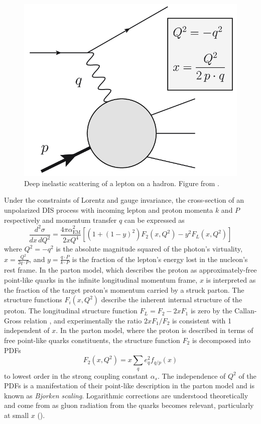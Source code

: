 \begin{figure}[t]
  \includegraphics{dis_electron_proton.png}
  \caption{Deep inelastic scattering of a lepton on a hadron. Figure from .
}
  \label{fig:dis}
\end{figure}

Under the constraints of Lorentz and gauge invariance, the cross-section of an unpolarized \ac{DIS} process with incoming lepton and proton momenta $k$ and $P$ respectively and momentum transfer $q$ can be expressed as \cite{Tanabashi:2018oca}
\begin{equation}
  \frac{d^2 \sigma}{dx \, dQ^2} = \frac{4\pi\alpha^2_\textrm{EM}}{2xQ^4}\left[ \left(1+(1-y)^2\right) F_2\left(x, Q^2\right) - y^2 F_L \left(x, Q^2\right) \right]
  \label{eq:dis}
\end{equation}
where $Q^2 = -q^2$ is the absolute magnitude squared of the photon's virtuality, $x = \frac{Q^2}{2q \cdot P}$, and $y = \frac{q \cdot P}{k \cdot P}$ is the fraction of the lepton's energy lost in the nucleon's rest frame.
In the parton model, which describes the proton as approximately-free point-like quarks in the infinite longitudinal momentum frame, $x$ is interpreted as the fraction of the target proton's momentum carried by a struck parton.
The structure functions $F_i(x, Q^2)$ describe the inherent internal structure of the proton.
The longitudinal structure function $F_L = F_2 - 2xF_1$ is zero by the Callan-Gross relation \cite{Callan:1969uq}, and experimentally the ratio $2xF_1 / F_2$ is consistent with 1 independent of $x$.
In the parton model, where the proton is described in terms of free point-like quarks constituents, the structure function $F_2$ is decomposed into \acp{PDF}
\begin{equation}
F_2 \left(x, Q^2\right) = x \sum_q e_q^2 f_{q/p}(x)
\end{equation}
to lowest order in the strong coupling constant $\alpha_s$.
The independence of $Q^2$ of the \acp{PDF} is a manifestation of their point-like description in the parton model and is known as \emph{Bjorken scaling}.
Logarithmic corrections are understood theoretically and come from as gluon radiation from the quarks becomes relevant, particularly at small $x$ ().

